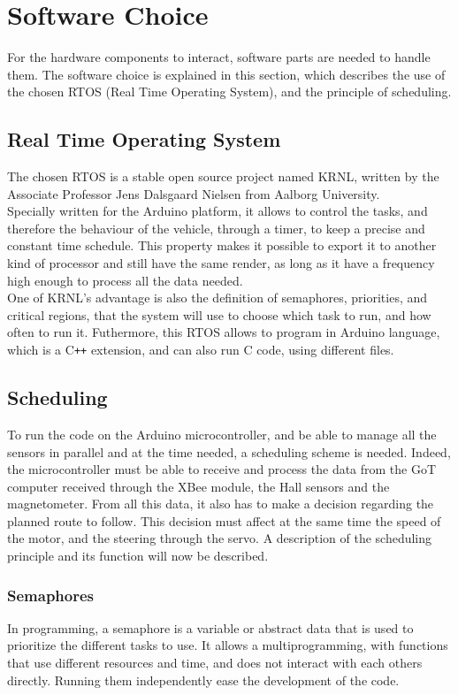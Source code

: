 \section{Software Choice}
For the hardware components to interact, software parts are needed to handle them. The software choice is explained in this section, which describes the use of the chosen RTOS (Real Time Operating System), and the principle of scheduling.

\subsection{Real Time Operating System}
The chosen RTOS is a stable open source project named KRNL, written by the Associate Professor Jens Dalsgaard Nielsen from Aalborg University.\\
Specially written for the Arduino platform, it allows to control the tasks, and therefore the behaviour of the vehicle, through a timer, to keep a precise and constant time schedule. This property makes it possible to export it to another kind of processor and still have the same render, as long as it have a frequency high enough to process all the data needed.\\
One of KRNL's advantage is also the definition of semaphores, priorities, and critical regions, that the system will use to choose which task to run, and how often to run it. Futhermore, this RTOS allows to program in Arduino language, which is a C\texttt{++} extension, and can also run C code, using different files.

\subsection{Scheduling}\label{sec:scheduling}
To run the code on the Arduino microcontroller, and be able to manage all the sensors in parallel and at the time needed, a scheduling scheme is needed. Indeed, the microcontroller must be able to receive and process the data from the GoT computer received through the XBee module, the Hall sensors and the magnetometer. From all this data, it also has to make a decision regarding the planned route to follow. This decision must affect at the same time the speed of the motor, and the steering through the servo.
A description of the scheduling principle and its function will now be described.


\subsubsection{Semaphores}
In programming, a semaphore is a variable or abstract data that is used to prioritize the different tasks to use. It allows a multiprogramming, with functions that use different resources and time, and does not interact with each others directly. Running them independently ease the development of the code.


